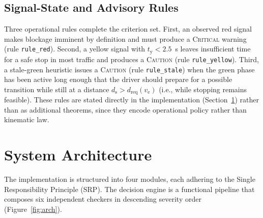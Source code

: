 \documentclass[conference, a4paper]{IEEEtran}
\theoremstyle{plain}
\newcommand{\dreq}{d_{\mathrm{req}}}
\newcommand{\ds}{d_{\mathrm{s}}}
\newcommand{\tred}{t_{\mathrm{y}}}
\newcommand{\ve}{v_{\mathrm{e}}}
\begin{document}
\subsection{Signal-State and Advisory Rules}
\label{subsec:signal}

Three operational rules complete the criterion set. First, an observed red
signal makes blockage imminent by definition and must produce a
\textsc{Critical} warning (rule \texttt{rule\_red}). Second, a yellow
signal with $\tred < 2.5$~s leaves insufficient time for a safe stop in most
traffic and produces a \textsc{Caution} (rule \texttt{rule\_yellow}).
Third, a stale-green heuristic issues a \textsc{Caution} (rule
\texttt{rule\_stale}) when the green phase has been active long enough that
the driver should prepare for a possible transition while still at a distance
$\ds > \dreq(\ve)$ (i.e., while stopping remains feasible). These rules are
stated directly in the implementation (Section~\ref{sec:arch}) rather than as
additional theorems, since they encode operational policy rather than
kinematic law.

\section{System Architecture}
\label{sec:arch}

The implementation is structured into four modules, each adhering to the
Single Responsibility Principle (SRP). The decision engine is a functional
pipeline that composes six independent checkers in descending severity order
(Figure~\ref{fig:arch}).
\end{document}

